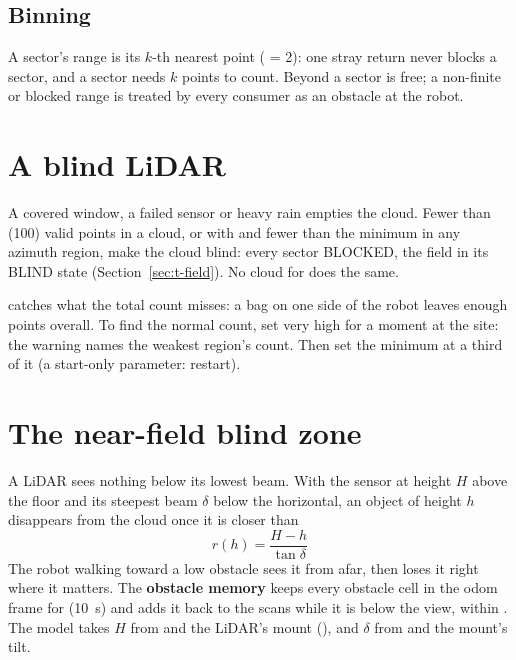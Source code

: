 \subsection{Binning}

A sector's range is its $k$-th nearest point ( = 2): one stray return never blocks a
sector, and a sector needs $k$ points to count. Beyond  a sector is free; a
non-finite or blocked range is treated by every consumer as an obstacle at the robot.

\section{A blind LiDAR}

A covered window, a failed sensor or heavy rain empties the cloud. Fewer than 
(\num{100}) valid points in a cloud, or with  and  fewer
than the minimum in any azimuth region, make the cloud blind: every sector BLOCKED, the field in
its BLIND state (Section~\ref{sec:t-field}). No cloud for  does the same.

\begin{tipbox}
 catches what the total count misses: a bag on one side of the robot
leaves enough points overall. To find the normal count, set  very
high for a moment at the site: the warning  names the
weakest region's count. Then set the minimum at a third of it (a start-only parameter: restart).
\end{tipbox}

\section{The near-field blind zone}

A LiDAR sees nothing below its lowest beam. With the sensor at height $H$ above the floor and its
steepest beam $\delta$ below the horizontal, an object of height $h$ disappears from the cloud
once it is closer than
\begin{equation}
  r(h) = \frac{H - h}{\tan\delta}
\end{equation}
The robot walking toward a low obstacle sees it from afar, then loses it right where it matters.
The \textbf{obstacle memory} keeps every obstacle cell in the odom frame for 
(\SI{10}{s}) and adds it back to the scans while it is below the view, within .
The model takes $H$ from  and the LiDAR's mount (), and
$\delta$ from  and the mount's tilt.


